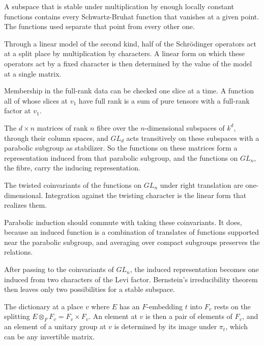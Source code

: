 A subspace that is stable under multiplication by enough locally constant
functions contains every Schwartz-Bruhat function that vanishes at a given point.
The functions used separate that point from every other one.

Through a linear model of the second kind, half of the Schrödinger operators
act at a split place by multiplication by characters. A linear form on which
these operators act by a fixed character is then determined by the value of the
model at a single matrix.

Membership in the full-rank data can be checked one slice at a time. A function
all of whose slices at $v_1$ have full rank is a sum of pure tensors with a
full-rank factor at $v_1$.

The $d\times n$ matrices of rank $n$ fibre over the $n$-dimensional subspaces of
$k^d$, through their column spaces, and $GL_d$ acts transitively on these
subspaces with a parabolic subgroup as stabilizer. So the functions on these
matrices form a representation induced from that parabolic subgroup, and the
functions on $GL_n$, the fibre, carry the inducing representation.

The twisted coinvariants of the functions on $GL_n$ under right translation are
one-dimensional. Integration against the twisting character is the linear form
that realizes them.

Parabolic induction should commute with taking these coinvariants. It does,
because an induced function is a combination of translates of functions
supported near the parabolic subgroup, and averaging over compact subgroups
preserves the relations.

After passing to the coinvariants of $GL_n$, the induced representation becomes
one induced from two characters of the Levi factor. Bernstein's irreducibility
theorem then leaves only two possibilities for a stable subspace.

The dictionary at a place $v$ where $E$ has an $F$-embedding $t$ into $F_v$
rests on the splitting $E\otimes_FF_v=F_v\times F_v$. An element at $v$ is then
a pair of elements of $F_v$, and an element of a unitary group at $v$ is
determined by its image under $\pi_t$, which can be any invertible matrix.

